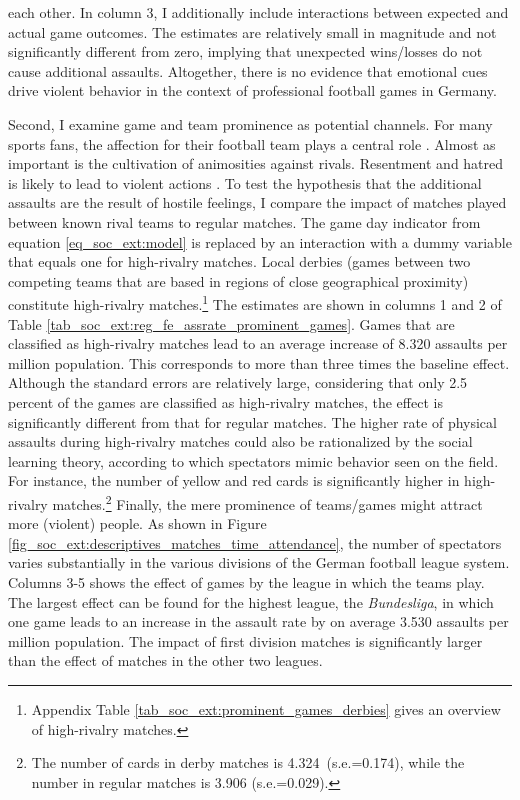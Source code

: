 each other. In column 3, I additionally include interactions between expected and actual game outcomes. The estimates are relatively small in magnitude and not significantly different from zero, implying that unexpected wins/losses do not cause additional assaults. Altogether, there is no evidence that emotional cues drive violent behavior in the context of professional football games in Germany.





Second, I examine game and team prominence as potential channels. For many sports fans, the affection for their football team plays a central role \citep{wann1993sports}. Almost as important is the cultivation of animosities against rivals. Resentment and hatred is likely to lead to violent actions \citep{nassauer2011hate}. To test the hypothesis that the additional assaults are the result of hostile feelings, I compare the impact of matches played between known rival teams to regular matches. The game day indicator from equation \ref{eq_soc_ext:model} is replaced by an interaction with a dummy variable that equals one for high-rivalry matches. Local derbies (games between two competing teams that are based in regions of close geographical proximity) constitute high-rivalry matches.\footnote{Appendix Table \ref{tab_soc_ext:prominent_games_derbies} gives an overview of high-rivalry matches.} The estimates are shown in columns 1 and 2 of Table \ref{tab_soc_ext:reg_fe_assrate_prominent_games}. Games that are classified as high-rivalry matches lead to an average increase of 8.320 assaults per million population. This corresponds to more than three times the baseline effect. Although the standard errors are relatively large, considering that only 2.5 percent of the games are classified as high-rivalry matches, the effect is significantly different from that for regular matches. The higher rate of physical assaults during high-rivalry matches could also be rationalized by the social learning theory, according to which spectators mimic behavior seen on the field. For instance, the number of yellow and red cards is significantly higher in high-rivalry matches.\footnote{The number of cards in derby matches is 4.324\ (s.e.=0.174), while the number in regular matches is 3.906 (s.e.=0.029).} Finally, the mere prominence of teams/games might attract more (violent) people. As shown in Figure \ref{fig_soc_ext:descriptives_matches_time_attendance}, the number of spectators varies substantially in the various divisions of the German football league system. Columns 3-5 shows the effect of games by the league in which the teams play. The largest effect can be found for the highest league, the \textit{Bundesliga}, in which one game leads to an increase in the assault rate by on average 3.530 assaults per million population. The impact of first division matches is significantly larger than the effect of matches in the other two leagues.
